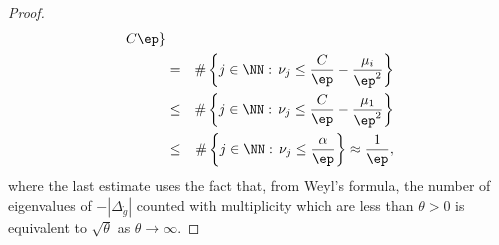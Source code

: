 \begin{proof}
\begin{eqnarray*}
        C\ep\}\\
                                 & = & \#\left\{j\in\NN:\,\nu_j\leq
                                 \frac{C}{\ep}-\frac{\mu_i}{\ep^2}\right\}\\
                                 & \leq & \#\left\{j\in\NN:\,\nu_j\leq
                                 \frac{C}{\ep}-\frac{\mu_1}{\ep^2}\right\}\\
                                 & \leq & \#\left\{j\in\NN:\,\nu_j\leq
                                     \frac{\alpha}{\ep}
                                 \right\}\approx \frac{1}{\ep},
        \end{eqnarray*}
        where the last estimate uses the fact that, from Weyl's formula, the number
        of eigenvalues of $-|\Delta_{\mathring g}|$ counted with multiplicity which
        are less than $\theta>0$ is equivalent to $\sqrt{\theta}$ as $\theta\to\infty$.

    \end{proof}
